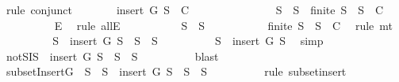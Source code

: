 \begin{isabellebody}
\ {\isacharparenleft}rule\ conjunct{}{\isacharparenright}\isanewline
\ \ \ \ \isamarkupfalse%
\ \isamarkupfalse%
\ {\isachardoublequoteopen}insert\ G\ S{}\ {\isasymnotin}\ C{\isachardoublequoteclose}\isanewline
\ \ \ \ \isamarkupfalse%
\ {\isacharminus}\ \isanewline
\ \ \ \ \ \ \isamarkupfalse%
\ {\isachardoublequoteopen}S{}\ {\isasymsubseteq}\ S\ {\isasymlongrightarrow}\ finite\ S{}\ {\isasymlongrightarrow}\ S{}\ {\isasymin}\ C{\isachardoublequoteclose}\isanewline
\ \ \ \ \ \ \ \ \isamarkupfalse%
\ E{\isacharprime}\ \isamarkupfalse%
\ {\isacharparenleft}rule\ allE{\isacharparenright}\isanewline
\ \ \ \ \ \ \isamarkupfalse%
\ \isamarkupfalse%
\ {\isachardoublequoteopen}{\isasymnot}\ S{}\ {\isasymsubseteq}\ S{\isachardoublequoteclose}\isanewline
\ \ \ \ \ \ \ \ \isamarkupfalse%
\ {\isacartoucheopen}{\isasymnot}\ {\isacharparenleft}finite\ S{}\ {\isasymlongrightarrow}\ S{}\ {\isasymin}\ C{\isacharparenright}{\isacartoucheclose}\ \isamarkupfalse%
\ {\isacharparenleft}rule\ mt{\isacharparenright}\isanewline
\ \ \ \ \ \ \isamarkupfalse%
\ \isamarkupfalse%
\ {\isachardoublequoteopen}{\isacharparenleft}S{}\ {\isasymsubseteq}\ insert\ G\ S{\isacharparenright}\ {\isasymnoteq}\ {\isacharparenleft}S{}\ {\isasymsubseteq}\ S{\isacharparenright}{\isachardoublequoteclose}\isanewline
\ \ \ \ \ \ \ \ \isamarkupfalse%
\ {\isacartoucheopen}S{}\ {\isasymsubseteq}\ insert\ G\ S{\isacartoucheclose}\ \isamarkupfalse%
\ simp\isanewline
\ \ \ \ \ \ \isamarkupfalse%
\ \isamarkupfalse%
\ notSI{\isacharcolon}{\isachardoublequoteopen}{\isasymnot}{\isacharparenleft}S{}\ {\isasymsubseteq}\ insert\ G\ S\ {\isasymlongleftrightarrow}\ S{}\ {\isasymsubseteq}\ S{\isacharparenright}{\isachardoublequoteclose}\isanewline
\ \ \ \ \ \ \ \ \isamarkupfalse%
\ blast\isanewline
\ \ \ \ \ \ \isamarkupfalse%
\ subsetInsert{\isacharcolon}{\isachardoublequoteopen}G\ {\isasymnotin}\ S{}\ {\isasymLongrightarrow}\ S{}\ {\isasymsubseteq}\ insert\ G\ S\ {\isasymlongleftrightarrow}\ S{}\ {\isasymsubseteq}\ S{\isachardoublequoteclose}\isanewline
\ \ \ \ \ \ \ \ \isamarkupfalse%
\ {\isacharparenleft}rule\ subset{\isacharunderscore}insert{\isacharparenright}\isanewline

\end{isabellebody}
